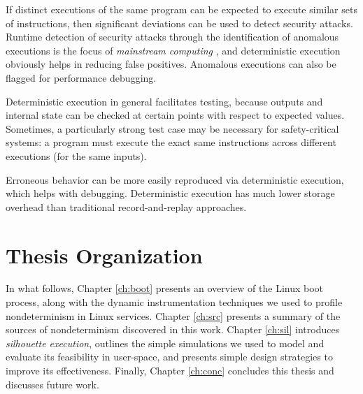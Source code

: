  \newline
If distinct executions of the same program can be
expected to execute similar sets of instructions, then
significant deviations can be used to detect security
attacks. Runtime detection of security attacks through the
identification of anomalous executions is the focus of \emph{mainstream computing} \cite{stephenson2010mainstream},
and deterministic execution obviously helps in reducing false
positives. 
Anomalous executions can also be flagged for performance
debugging. \newline

  \newline
Deterministic execution in general facilitates testing,
because outputs and internal state can be checked at 
certain points with respect to expected values. 
Sometimes, a particularly strong 
test case may be necessary for safety-critical 
systems: a program 
must execute the exact same instructions 
across different executions (for the same inputs). \newline 

 \newline 
Erroneous behavior can be more easily reproduced
via deterministic execution, which
helps with debugging. Deterministic
execution has much lower storage overhead
than traditional record-and-replay approaches. 

\section{Thesis Organization} 
In what follows, Chapter \ref{ch:boot} presents an overview of
the Linux boot process, along with the dynamic instrumentation
techniques we used to profile nondeterminism in Linux services.
Chapter \ref{ch:src} presents a summary of the sources of nondeterminism
discovered in this work.
Chapter \ref{ch:sil} introduces {\em silhouette execution},
outlines the simple simulations we used to model
and evaluate its feasibility in user-space,
and presents simple design strategies to 
improve its effectiveness.
Finally, Chapter \ref{ch:conc} concludes this thesis and discusses future work.
